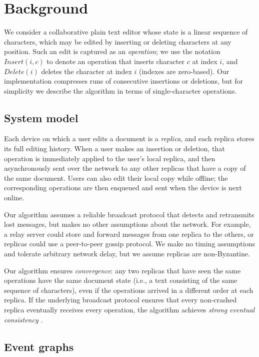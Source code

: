 \documentclass[sigplan,10pt]{acmart}
\begin{document}
\section{Background}

We consider a collaborative plain text editor whose state is a linear sequence of characters, which may be edited by inserting or deleting characters at any position.
Such an edit is captured as an \emph{operation}; we use the notation $\mathit{Insert}(i, c)$ to denote an operation that inserts character $c$ at index $i$, and $\mathit{Delete}(i)$ deletes the character at index $i$ (indexes are zero-based).
Our implementation compresses runs of consecutive insertions or deletions, but for simplicity we describe the algorithm in terms of single-character operations.

\subsection{System model}

Each device on which a user edits a document is a \emph{replica}, and each replica stores its full editing history.
When a user makes an insertion or deletion, that operation is immediately applied to the user's local replica, and then asynchronously sent over the network to any other replicas that have a copy of the same document.
Users can also edit their local copy while offline; the corresponding operations are then enqueued and sent when the device is next online.

Our algorithm assumes a reliable broadcast protocol that detects and retransmits lost messages, but makes no other assumptions about the network.
For example, a relay server could store and forward messages from one replica to the others, or replicas could use a peer-to-peer gossip protocol.
We make no timing assumptions and tolerate arbitrary network delay, but we assume replicas are non-Byzantine.

Our algorithm ensures \emph{convergence}: any two replicas that have seen the same operations have the same document state (i.e., a text consisting of the same sequence of characters), even if the operations arrived in a different order at each replica.
If the underlying broadcast protocol ensures that every non-crashed replica eventually receives every operation, the algorithm achieves \emph{strong eventual consistency} \cite{Shapiro2011}.

\subsection{Event graphs}\label{event-graphs}
\end{document}
